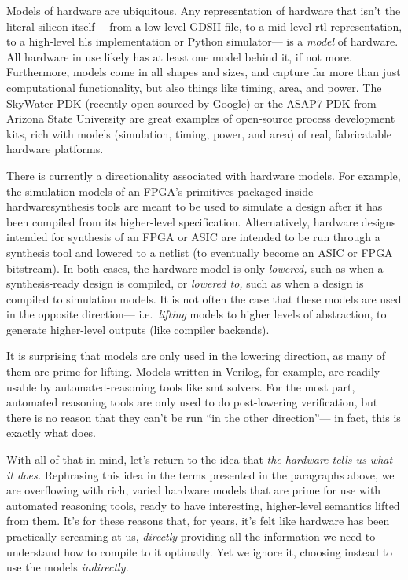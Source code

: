 Models of hardware are ubiquitous.
Any representation of hardware
  that isn't the literal silicon itself---%
  from a low-level GDSII file,
  to a mid-level \gls{rtl} representation,
  to a high-level \gls{hls} implementation or Python simulator---%
  is a \textit{model} of hardware.
All hardware in use
  likely has at least one model behind it,
  if not more.
Furthermore,
  models come in all shapes and sizes,
  and capture far more than just
  computational functionality,
  but also things like
  timing,
  area,
  and power.
The SkyWater PDK (recently open sourced
  by Google)
  or the ASAP7 PDK from Arizona State University
  are great examples
  of open-source process development kits,
  rich with models (simulation, timing, power, and area)
  of real, fabricatable
  hardware platforms.

There is currently a directionality
  associated with hardware models.
For example, the simulation
  models
  of an FPGA's primitives
  packaged inside \gls{hardwaresynthesis}
  tools
  are meant to be used
  to simulate a design
  after it has been compiled
  from its higher-level specification.
Alternatively,
  hardware designs intended for synthesis
  of an FPGA
  or ASIC
  are intended to be run through a synthesis tool
  and lowered to a netlist
  (to eventually become an ASIC
    or FPGA bitstream).
In both cases,
  the hardware model is only 
  \textit{lowered,} 
  such as when a synthesis-ready design
  is compiled,
  or \textit{lowered to,}
  such as when a design is compiled
  to simulation models.
It is not often the case that
  these models are used in the opposite direction---%
  i.e.~\textit{lifting} models
  to higher levels of abstraction,
  to generate higher-level outputs
  (like compiler backends).

It is surprising
  that models are only used in the lowering direction,
  as many of them are
  prime for lifting.
Models written in Verilog,
  for example,
  are readily usable
  by \gls{automated-reasoning} tools
  like \gls{smt} solvers.
For the most part,
  automated reasoning tools
  are only used to do post-lowering
  \gls{verification},
  but there is no reason that they
  can't be run ``in the other direction''---%
  in fact, this is exactly what \lr does.

With all of that in mind,
  let's return to the idea that
  \textit{the hardware tells us what it does.}
Rephrasing this idea
  in the terms presented in the paragraphs above,
  we are overflowing with rich,
  varied hardware models
  that are prime for use
  with automated reasoning tools,
  ready to have interesting,
  higher-level semantics
  lifted from them.
It's for these reasons
  that,
  for years,
  it's felt like hardware
  has been practically screaming at us,
  \textit{directly} providing all the information we need
  to understand how to compile to it optimally.
Yet we ignore it, choosing instead to use
  the models \textit{indirectly.}

